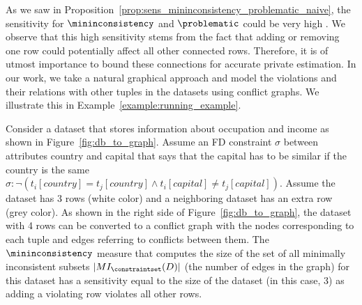 
As we saw in Proposition~\ref{prop:sens_mininconsistency_problematic_naive}, the sensitivity for $\mininconsistency$ and $\problematic$ could be very high . We observe that this high sensitivity stems from the fact that adding or removing one row could potentially affect all other connected rows. Therefore, it is of utmost importance to bound these connections for accurate private estimation.  In our work, we take a natural graphical approach and model the violations and their relations with other tuples in the datasets using conflict graphs. We illustrate this in Example~\ref{example:running_example}. 


\begin{example}
     Consider a dataset that stores information about occupation and income as shown in Figure~\ref{fig:db_to_graph}. Assume an FD constraint $\sigma$ between attributes country and capital that says that the capital has to be similar if the country is the same $\sigma: \neg (t_i[country]=t_j[country] \land t_i[capital] \neq t_j[capital])$. Assume the dataset has 3 rows (white color) and a neighboring dataset has an extra row (grey color). As shown in the right side of Figure~\ref{fig:db_to_graph}, the dataset with 4 rows can be converted to a conflict graph with the nodes corresponding to each tuple and edges referring to conflicts between them. The $\mininconsistency$ measure that computes the size of the set of all minimally inconsistent subsets $|MI_\constraintset(D)|$ (the number of edges in the graph) for this dataset has a sensitivity equal to the size of the dataset (in this case, 3) as adding a violating row violates all other rows.
     \label{example:running_example}
\end{example}



